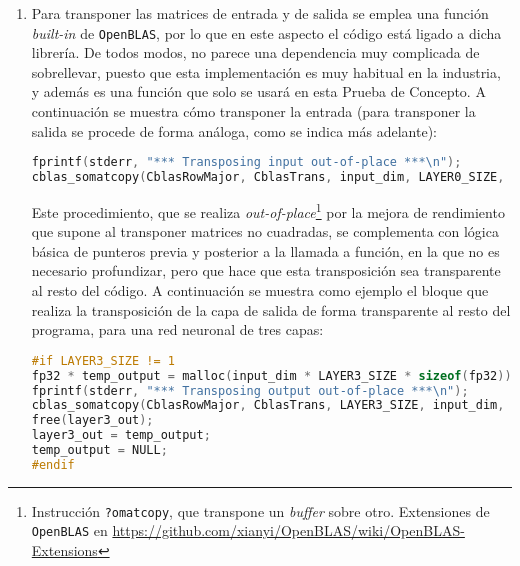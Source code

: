 \begin{enumerate}
    \item Para transponer las matrices de entrada y de salida se emplea una función \textit{built-in} de \texttt{OpenBLAS}, por lo que en este aspecto el código está ligado a dicha librería. De todos modos, no parece una dependencia muy complicada de sobrellevar, puesto que esta implementación es muy habitual en la industria, y además es una función que solo se usará en esta Prueba de Concepto. A continuación se muestra cómo transponer la entrada (para transponer la salida se procede de forma análoga, como se indica más adelante):\medskip
\begin{lstlisting}[language=C]
fprintf(stderr, "*** Transposing input out-of-place ***\n");
cblas_somatcopy(CblasRowMajor, CblasTrans, input_dim, LAYER0_SIZE, 1.f, (float *) input, LAYER0_SIZE, (float *) temp_input, input_dim);
\end{lstlisting}

    Este procedimiento, que se realiza \textit{out-of-place}\footnote{Instrucción \texttt{?omatcopy}, que transpone un \textit{buffer} sobre otro. Extensiones de \texttt{OpenBLAS} en \url{https://github.com/xianyi/OpenBLAS/wiki/OpenBLAS-Extensions}} por la mejora de rendimiento que supone al transponer matrices no cuadradas, se complementa con lógica básica de punteros previa y posterior a la llamada a función, en la que no es necesario profundizar, pero que hace que esta transposición sea transparente al resto del código. A continuación se muestra como ejemplo el bloque que realiza la transposición de la capa de salida de forma transparente al resto del programa, para una red neuronal de tres capas:\medskip
\begin{lstlisting}[language=C]
#if LAYER3_SIZE != 1
fp32 * temp_output = malloc(input_dim * LAYER3_SIZE * sizeof(fp32));
fprintf(stderr, "*** Transposing output out-of-place ***\n");
cblas_somatcopy(CblasRowMajor, CblasTrans, LAYER3_SIZE, input_dim, 1.f, (float *) layer3_out, input_dim, (float *) temp_output, LAYER3_SIZE);
free(layer3_out);
layer3_out = temp_output;
temp_output = NULL;
#endif
\end{lstlisting}


\end{enumerate}
